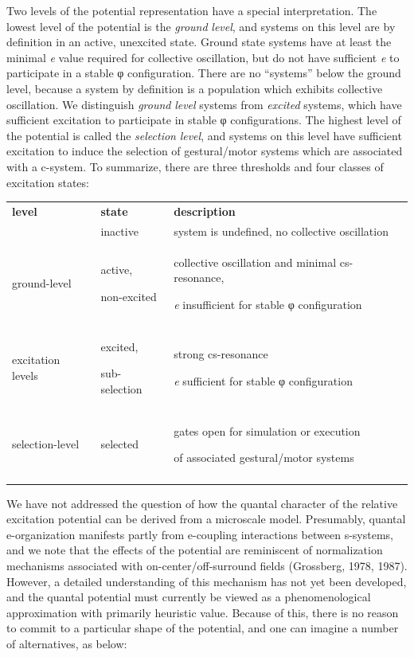   Two levels of the potential representation have a special  interpretation. The lowest level of the potential is the \textit{ground} \textit{level}, and systems on this level are by definition in an active, unexcited state. Ground state systems have at least the minimal \textit{e} value required for collective oscillation, but do not have sufficient \textit{e} to participate in a stable φ configuration. There are no “systems” below the ground level, because a system by definition is a population which exhibits collective oscillation. We distinguish \textit{ground} \textit{level} systems from \textit{excited} systems, which have sufficient excitation to participate in stable φ configurations. The highest level of the potential is called the \textit{selection} \textit{level}, and systems on this level have sufficient excitation to induce the selection of gestural/motor systems which are associated with a c-system. To summarize, there are three thresholds and four classes of excitation states:

\begin{tabularx}{\textwidth}{XXX}
\lsptoprule
\textbf{level} & \textbf{state} & \textbf{description}\\
& inactive & system is undefined, no collective oscillation\\
\raggedleft ground-level & active,

non-excited & collective oscillation and minimal cs-resonance, 

\textit{e} insufficient for stable φ configuration\\
\raggedleft excitation levels & excited,

sub-selection & strong cs-resonance

\textit{e} sufficient for stable φ configuration\\
\raggedleft selection-level & selected & gates open for simulation or execution 

of associated gestural/motor systems\\
\lspbottomrule
\end{tabularx}
  We have not addressed the question of how the quantal character of the relative excitation potential can be derived from a microscale model. Presumably, quantal e-organization manifests partly from e-coupling interactions between s-systems, and we note that the effects of the potential are reminiscent of normalization mechanisms associated with on-center/off-surround fields (Grossberg, 1978, 1987). However, a detailed understanding of this mechanism has not yet been developed, and the quantal potential must currently be viewed as a phenomenological approximation with primarily heuristic value. Because of this, there is no reason to commit to a particular shape of the potential, and one can imagine a number of alternatives, as below:

